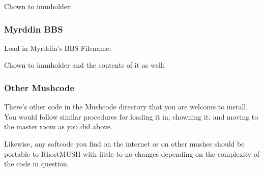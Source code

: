 \documentclass[letterpaper,10pt,english]{sphinxmanual}
\begin{document}
\sphinxAtStartPar
Chown to immholder:

\begin{sphinxVerbatim}[commandchars=\\\{\}]
 
 
  
\end{sphinxVerbatim}


\subsubsection{Myrddin BBS}
\label{\detokenize{gettingstarted:myrddin-bbs}}
\sphinxAtStartPar
Load in Myrddin’s BBS
Filename:

\begin{sphinxVerbatim}[commandchars=\\\{\}]
\end{sphinxVerbatim}

\sphinxAtStartPar
Chown to immholder and the contents of it as well:

\begin{sphinxVerbatim}[commandchars=\\\{\}]
 
  
 
\end{sphinxVerbatim}


\subsubsection{Other Mushcode}
\label{\detokenize{gettingstarted:other-mushcode}}
\sphinxAtStartPar
There’s other code in the Mushcode directory that you are welcome to install.  You would follow similar procedures
for loading it in, chowning it, and moving to the master room as you did above.

\sphinxAtStartPar
Likewise, any softcode you find on the internet or on other mushes should be portable to RhostMUSH with little to
no changes depending on the complexity of the code in question.
\end{document}
